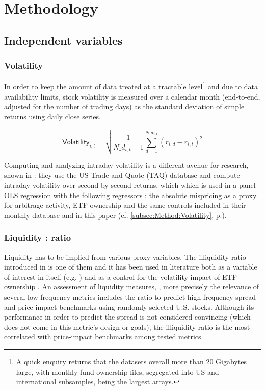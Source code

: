 \section{Methodology}
\label{sec:Methodology}
\subsection{Independent variables}
\subsubsection{Volatility}
In order to keep the amount of data treated at a tractable level\footnote{A quick enquiry returns that the datasets overall more than 20 Gigabytes large, with monthly fund ownership files, segregated into US and international subsamples, being the largest arrays.} and due to data availability limits, stock volatility is measured over a calendar month (end-to-end, adjusted for the number of trading days) as the standard deviation of simple returns using daily close series.

\begin{equation}
  \mathsf{Volatility}_{i, t} = \sqrt{\frac{1}{N\_d_{i, t} - 1} \sum_{d = 1}^{N\_d_{i, t}} (r_{i, d} - \bar{r}_{i, t})^2}
  \end{equation}

Computing and analyzing intraday volatility is a different avenue for research, shown in \textcite{Ben-David2018} : they use the US Trade and Quote (TAQ) database and compute intraday volatility over second-by-second returns, which which is used in a panel OLS regression with the following regressors : the absolute mispricing as a proxy for arbitrage activity, ETF ownership and the same controls included in their monthly database and in this paper (cf. \autoref{subsec:Method:Volatility}, p.\pageref{subsec:Method:Volatility}).
\subsubsection{Liquidity : \textcite{Amihud2002} ratio}
\label{sec:Methodology:sub:Independent:sub:Liquidity}
Liquidity has to be implied from various proxy variables. The illiquidity ratio introduced in \textcite{Amihud2002} is one of them and it has been used in literature both as a variable of interest in itself (e.g. \textcite{Israeli2017}) and as a control for the volatility impact of ETF ownership \parencite{Ben-David2018}. An assessment of liquidity measures, \textcite{Goyenko2009}, more precisely the relevance of several low frequency metrics includes the \textcite{Amihud2002} ratio to predict high frequency spread and price impact benchmarks using randomly selected U.S. stocks. Although its performance in order to predict the spread is not considered convincing (which does not come in this metric's design or goals), the \textcite{Amihud2002} illiquidity ratio is the most correlated with price-impact benchmarks among tested metrics.
 
